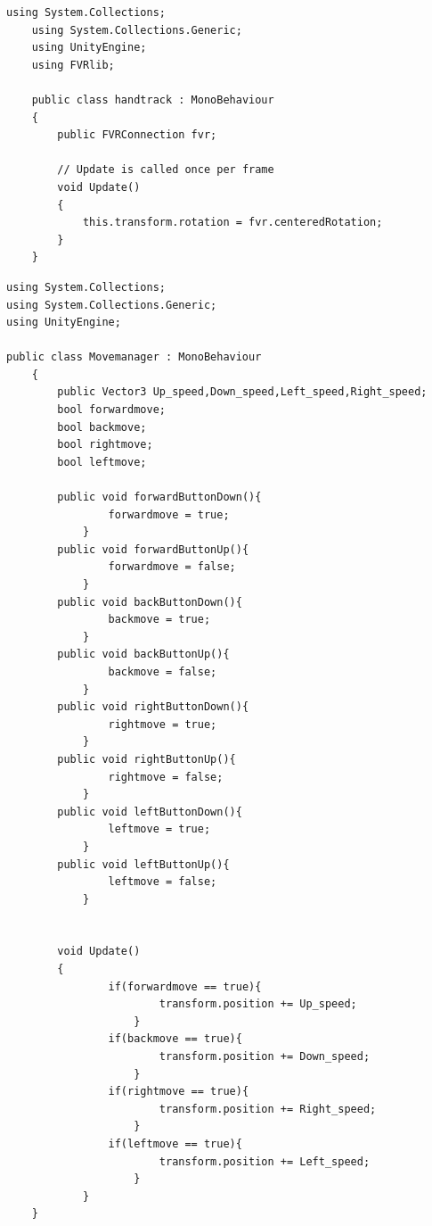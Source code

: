 \documentclass{ltjsreport}
\begin{document}
\begin{lstlisting}[caption=handtrack.cs, label=code:track]
	using System.Collections;
	using System.Collections.Generic;
	using UnityEngine;
	using FVRlib;

	public class handtrack : MonoBehaviour
	{
		public FVRConnection fvr;

		// Update is called once per frame
		void Update()
		{
			this.transform.rotation = fvr.centeredRotation;
		}
	}
\end{lstlisting}

\begin{lstlisting}[caption=MoveManager.cs, label=code:Move]
	using System.Collections;
using System.Collections.Generic;
using UnityEngine;

public class Movemanager : MonoBehaviour
	{
		public Vector3 Up_speed,Down_speed,Left_speed,Right_speed;
		bool forwardmove;
		bool backmove;
		bool rightmove;
		bool leftmove;

		public void forwardButtonDown(){
				forwardmove = true;
			}
		public void forwardButtonUp(){
				forwardmove = false;
			}
		public void backButtonDown(){
				backmove = true;
			}
		public void backButtonUp(){
				backmove = false;
			}
		public void rightButtonDown(){
				rightmove = true;
			}
		public void rightButtonUp(){
				rightmove = false;
			}
		public void leftButtonDown(){
				leftmove = true;
			}
		public void leftButtonUp(){
				leftmove = false;
			}


		void Update()
		{
				if(forwardmove == true){
						transform.position += Up_speed;
					}
				if(backmove == true){
						transform.position += Down_speed;
					}
				if(rightmove == true){
						transform.position += Right_speed;
					}
				if(leftmove == true){
						transform.position += Left_speed;
					}
			}
	}
\end{lstlisting}
\end{document}
